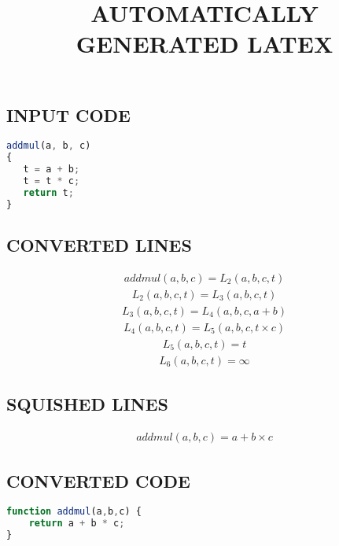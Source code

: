 \documentclass{article}
\begin{document}
\title{AUTOMATICALLY GENERATED LATEX}
\maketitle

\subsection{INPUT CODE}
\begin{lstlisting}[language=JavaScript]
addmul(a, b, c)
{
   t = a + b;
   t = t * c;
   return t;
}

\end{lstlisting}

\subsection{CONVERTED LINES}
\begin{equation*}\begin{split}
addmul \left(a,b,c \right) = L_{2} \left(a,b,c,t \right)
\end{split}\end{equation*}
\begin{equation*}\begin{split}
L_{2} \left(a,b,c,t \right) = L_{3} \left(a,b,c,t \right)
\end{split}\end{equation*}
\begin{equation*}\begin{split}
L_{3} \left(a,b,c,t \right) = L_{4} \left(a,b,c,a + b \right)
\end{split}\end{equation*}
\begin{equation*}\begin{split}
L_{4} \left(a,b,c,t \right) = L_{5} \left(a,b,c,t  \times  c \right)
\end{split}\end{equation*}
\begin{equation*}\begin{split}
L_{5} \left(a,b,c,t \right) = t
\end{split}\end{equation*}
\begin{equation*}\begin{split}
L_{6} \left(a,b,c,t \right) = \infty
\end{split}\end{equation*}


\subsection{SQUISHED LINES}
\begin{equation*}\begin{split}
addmul \left(a,b,c \right) = a + b  \times  c
\end{split}\end{equation*}


\subsection{CONVERTED CODE}
\begin{lstlisting}[language=JavaScript]
function addmul(a,b,c) {
    return a + b * c;
}

\end{lstlisting}
\end{document}
